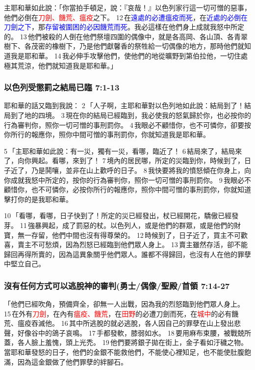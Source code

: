 主耶和華如此說：「你當拍手頓足，說：『哀哉！』以色列家行這一切可憎的惡事，他們必倒在\textcolor{red}{刀劍、饑荒、瘟疫}之下。 12 在\textcolor{blue}{遠處的必遭瘟疫而死}，在\textcolor{blue}{近處的必倒在刀劍之下}，那\textcolor{blue}{存留被圍困的必因饑荒而死}。我必這樣在他們身上成就我怒中所定的。 13 他們被殺的人倒在他們祭壇四圍的偶像中，就是各高岡、各山頂、各青翠樹下、各茂密的橡樹下，乃是他們獻馨香的祭牲給一切偶像的地方，那時他們就知道我是耶和華。 14 我必伸手攻擊他們，使他們的地從曠野到第伯拉他，一切住處極其荒涼，他們就知道我是耶和華。」

\subsubsection{以色列受懲罰之結局已臨 7:1-13}
耶和華的話又臨到我說： 2 「人子啊，主耶和華對以色列地如此說：結局到了！結局到了地的四境。 3 現在你的結局已經臨到，我必使我的怒氣歸於你，也必按你的行為審判你，照你一切可憎的事刑罰你。 4 我眼必不顧惜你，也不可憐你，卻要按你所行的報應你，照你中間可憎的事刑罰你，你就知道我是耶和華。

5 「主耶和華如此說：有一災，獨有一災，看哪，臨近了！ 6 結局來了，結局來了，向你興起。看哪，來到了！ 7 境內的居民哪，所定的災臨到你，時候到了，日子近了，乃是鬨嚷，並非在山上歡呼的日子。 8 我快要將我的憤怒傾在你身上，向你成就我怒中所定的，按你的行為審判你，照你一切可憎的事刑罰你。 9 我眼必不顧惜你，也不可憐你，必按你所行的報應你，照你中間可憎的事刑罰你，你就知道擊打你的是我耶和華。

10 「看哪，看哪，日子快到了！所定的災已經發出，杖已經開花，驕傲已經發芽。 11 強暴興起，成了罰惡的杖。以色列人，或是他們的群眾，或是他們的財寶，無一存留，他們中間也沒有得尊榮的。 12 時候到了，日子近了，買主不可歡喜，賣主不可愁煩，因為烈怒已經臨到他們眾人身上。 13 賣主雖然存活，卻不能歸回再得所賣的，因為這異象關乎他們眾人。誰都不得歸回，也沒有人在他的罪孽中堅立自己。

\subsubsection{沒有任何方式可以逃脫神的審判(勇士/偶像/聖殿/首領 7:14-27}
「他們已經吹角，預備齊全，卻無一人出戰，因為我的烈怒臨到他們眾人身上。 15 在外有\textcolor{red}{刀劍}，在內有\textcolor{red}{瘟疫、饑荒}，在\textcolor{red}{田野}的必遭刀劍而死，在\textcolor{red}{城中}的必有饑荒、瘟疫吞滅他。 16 其中所逃脫的就必逃脫，各人因自己的罪孽在山上發出悲聲，好像谷中的鴿子哀鳴。 17 手都發軟，膝弱如水。 18 要用麻布束腰，被戰兢所蓋，各人臉上羞愧，頭上光禿。 19 他們要將銀子拋在街上，金子看如汙穢之物。當耶和華發怒的日子，他們的金銀不能救他們，不能使心裡知足，也不能使肚腹飽滿，因為這金銀做了他們罪孽的絆腳石。

